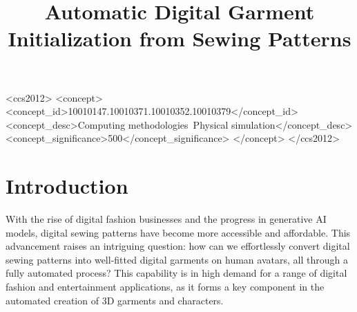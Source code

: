\documentclass[acmtog,anonymous,review]{acmart}
\begin{document}
\title{Automatic Digital Garment Initialization from Sewing Patterns}




%
%
\begin{CCSXML}
	<ccs2012>
	<concept>
	<concept_id>10010147.10010371.10010352.10010379</concept_id>
	<concept_desc>Computing methodologies~Physical simulation</concept_desc>
	<concept_significance>500</concept_significance>
	</concept>
	</ccs2012>
\end{CCSXML}





\maketitle
\section{Introduction}
With the rise of digital fashion businesses and the progress in generative AI models, digital sewing patterns have become more accessible and affordable. This advancement raises an intriguing question: how can we effortlessly convert digital sewing patterns into well-fitted digital garments on human avatars, all through a fully automated process? This capability is in high demand for a range of digital fashion and entertainment applications, as it forms a key component in the automated creation of 3D garments and characters.
\end{document}
